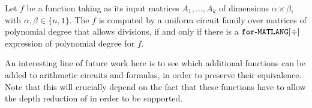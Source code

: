 \begin{corollary}
\label{cor-division}
Let $f$ be a function taking as its input matrices $A_1,\ldots ,A_k$ of dimensions $\alpha\times \beta$, with $\alpha,\beta \in \{n,1\}$. The $f$ is computed by a uniform circuit family over matrices of polynomial degree that allows divisions, if and only if there is a $\texttt{for}\text{-}\texttt{MATLANG}[\div]$ expression of polynomial degree for $f$.
\end{corollary}


An interesting line of future work here is to see which additional functions can be added to arithmetic circuits and \langfor formulas, in order to preserve their equivalence. Note that this will crucially depend on the fact that these functions have to allow the depth reduction of \cite{AllenderJMV98} in order to be supported.


